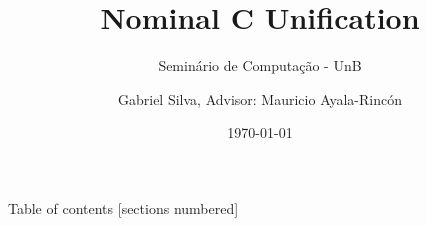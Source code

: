\documentclass{beamer}
\title{Nominal C Unification}
\subtitle{Seminário de Computação - UnB}
\date{\today}
\author{Gabriel Silva, Advisor: Mauricio Ayala-Rincón}
\institute{Department of Mathematics - University of Brasília}
\begin{document}
\maketitle

\begin{frame}{Table of contents}
    [sections numbered]
    \tableofcontents
\end{frame}

%
%

%
\end{document}
